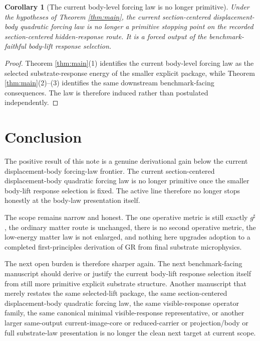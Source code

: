 \documentclass[11pt]{article}
\newcommand{\CompletedMetric}{g^{\sharp}}
\newtheorem{corollary}{Corollary}
\begin{document}
\begin{corollary}[The current body-level forcing law is no longer primitive]
\label{cor:nonprimitive}
Under the hypotheses of Theorem \ref{thm:main}, the current section-centered displacement-body quadratic forcing law is no longer a primitive stopping point on the recorded section-centered hidden-response route. It is a forced output of the benchmark-faithful body-lift response selection.
\end{corollary}

\begin{proof}
Theorem \ref{thm:main}(1) identifies the current body-level forcing law as the selected substrate-response energy of the smaller explicit package, while Theorem \ref{thm:main}(2)--(3) identifies the same downstream benchmark-facing consequences. The law is therefore induced rather than postulated independently.
\end{proof}

\section{Conclusion}

The positive result of this note is a genuine derivational gain below the current displacement-body forcing-law frontier. The current section-centered displacement-body quadratic forcing law is no longer primitive once the smaller body-lift response selection is fixed. The active line therefore no longer stops honestly at the body-law presentation itself.

The scope remains narrow and honest. The one operative metric is still exactly \(\CompletedMetric\), the ordinary matter route is unchanged, there is no second operative metric, the low-energy matter law is not enlarged, and nothing here upgrades adoption to a completed first-principles derivation of GR from final substrate microphysics.

The next open burden is therefore sharper again. The next benchmark-facing manuscript should derive or justify the current body-lift response selection itself from still more primitive explicit substrate structure. Another manuscript that merely restates the same selected-lift package, the same section-centered displacement-body quadratic forcing law, the same visible-response operator family, the same canonical minimal visible-response representative, or another larger same-output current-image-core or reduced-carrier or projection/body or full substrate-law presentation is no longer the clean next target at current scope.
\end{document}
